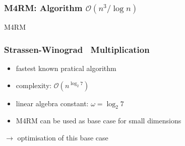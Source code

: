 \documentclass[11pt]{beamer}
\newcommand{\ord}[1]{\ensuremath{\mathcal{O}\!\left(#1\right)}}
\begin{document}
\begin{frame}[fragile]
\frametitle{M4RM: Algorithm $\ord{n^3/\log n}$}

\begin{algorithm}[H]
\caption{\textsc{M4RM}}
\label{alg:m4rm}
\end{algorithm}

\end{frame}

\begin{frame}
\frametitle{Strassen-Winograd~\cite{Strassen} Multiplication}
\begin{itemize}
 \item fastest known pratical algorithm
 \item complexity: $\ord{n^{\log_2{7}}}$
 \item linear algebra constant: $\omega = \log_2{7}$
 \item M4RM can be used as base case for small dimensions
\end{itemize}

\vspace{1em}

$\rightarrow$ optimisation of this base case

\end{frame}



% 
% 
\end{document}
